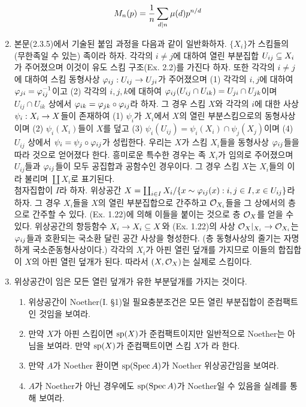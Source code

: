 \begin{enumerate}[label=\tb{2.\arabic*.},itemindent=0mm,itemsep=4mm]
	$$M_n(p)=\fra n\sum_{d|n}\mu(d)p^{n/d}$$
	\item {} 본문(2.3.5)에서 기술된 붙임 과정을 다음과 같이 일반화하자.
	$\{X_i\}$가 스킴들의 (무한족일 수 있는) 족이라 하자. 각각의 $i\ne j$에 대하여 열린 부분집합 $U_{ij}\bseq X_i$가 주어졌으며
	이것이 유도 스킴 구조(Ex. 2.2)를 가진다 하자.
	또한 각각의 $i\ne j$에 대하여 스킴 동형사상 $\ph_{ij}:U_{ij}\ra U_{ji}$가 주어졌으며
	(1) 각각의 $i,j$에 대하여 $\ph_{ji}=\ph_{ij}^{-1}$이고
	(2) 각각의 $i,j,k$에 대하여 $\ph_{ij}(U_{ij}\cap U_{ik})=U_{ji}\cap U_{jk}$이며
	$U_{ij}\cap U_{ik}$ 상에서 $\ph_{ik}=\ph_{jk}\circ\ph_{ij}$라 하자.
	그 경우 스킴 $X$와 각각의 $i$에 대한 사상 $\psi_i:X_i\ra X$들이 존재하여
	(1) $\psi_i$가 $X_i$에서 $X$의 열린 부분스킴으로의 동형사상이며
	(2) $\psi_i(X_i)$들이 $X$를 덮고
	(3) $\psi_i(U_{ij})=\psi_i(X_i)\cap\psi_j(X_j)$이며
	(4) $U_{ij}$ 상에서 $\psi_i=\psi_j\circ\ph_{ij}$가 성립한다.
	우리는 $X$가 스킴 $X_i$들을 동형사상 $\ph_{ij}$들을 따라  것으로 얻어졌다 한다.
	흥미로운 특수한 경우는 족 $X_i$가 임의로 주어졌으며 $U_{ij}$들과 $\ph_{ij}$들이 모두 공집합과 공함수인 경우이다.
	그 경우 스킴 $X$는 $X_i$들의 이라 불리며 $\coprod X_i$로 표기된다.\\
	\sol 첨자집합이 $I$라 하자. 위상공간 $X=\coprod_{i\in I}X_i/\sx{x\sim\ph_{ij}(x)}{i,j\in I,x\in U_{ij}}$라 하자.
	그 경우 $X_i$들을 $X$의 열린 부분집합으로 간주하고 $\mc O_{X_i}$들을 그 상에서의 층으로 간주할 수 있다.
	(Ex. 1.22)에 의해 이들을 붙이는 것으로 층 $\mc O_X$를 얻을 수 있다.
	위상공간의 항등함수 $X_i\ra X_i\bseq X$와 (Ex. 1.22)의 사상 $\mc O_X\rest_{X_i}\ra\mc O_{X_i}$는
	$\ph_{ij}$들과 호환되는 국소환 달린 공간 사상을 형성한다. (층 동형사상의 줄기는 자명하게 국소준동형사상이다.)
	각각의 $X_i$가 아핀 열린 덮개를 가지므로 이들의 합집합이 $X$의 아핀 열린 덮개가 된다.
	따라서 $(X,\mc O_X)$는 실제로 스킴이다.
	\item 위상공간이 임은 모든 열린 덮개가 유한 부분덮개를 가지는 것이다.
	\begin{enumerate}[label=(\alph*)]
	\item 위상공간이 Noether(I. \S 1)일 필요충분조건은 모든 열린 부분집합이 준컴팩트인 것임을 보여라.
	\item 만약 $X$가 아핀 스킴이면 $\sp(X)$가 준컴팩트이지만 일반적으로 Noether는 아님을 보여라.
	만약 $\sp(X)$가 준컴팩트이면 스킴 $X$가 라 한다.
	\item 만약 $A$가 Noether 환이면 $\sp(\Spec A)$가 Noether 위상공간임을 보여라.
	\item $A$가 Noether가 아닌 경우에도 $\sp(\Spec A)$가 Noether일 수 있음을 실례를 통해 보여라.

\end{enumerate}
\end{enumerate}
